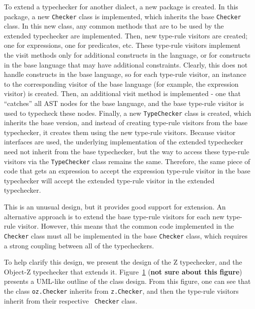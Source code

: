 \documentclass{llncs}
\begin{document}
To extend a typechecker for another dialect, a new package is created.
In this package, a new {\tt Checker} class is implemented, which
inherits the base {\tt Checker} class. In this new class, any common
methods that are to be used by the extended typechecker are
implemented. Then, new type-rule visitors are created; one for
expressions, one for predicates, etc.  These type-rule visitors
implement the visit methods only for additional constructs in the
language, or for constructs in the base language that may have
additional constraints. Clearly, this does not handle constructs in
the base language, so for each type-rule visitor, an instance to the
corresponding visitor of the base language (for example, the
expression visitor) is created. Then, an additional visit method is
implemented - one that ``catches'' all AST nodes for the base
language, and the base type-rule visitor is used to typecheck these
nodes. Finally, a new {\tt TypeChecker} class is created, which
inherits the base version, and instead of creating type-rule visitors
from the base typechecker, it creates them using the new type-rule
visitors. Because visitor interfaces are used, the underlying
implementation of the extended typechecker need not inherit from the
base typechecker, but the way to access these type-rule visitors via
the {\tt TypeChecker} class remains the same. Therefore, the same
piece of code that gets an expression to accept the expression
type-rule visitor in the base typechecker will accept the extended
type-rule visitor in the extended typechecker.

This is an unusual design, but it provides good support for
extension. An alternative approach is to extend the base type-rule
visitors for each new type-rule visitor. However, this means that the
common code implemented in the {\tt Checker} class must all be
implemented in the base {\tt Checker} class, which requires a strong
coupling between all of the typecheckers.

To help clarify this design, we present the design of the Z
typechecker, and the Object-Z typechecker that extends
it. Figure~\ref{tc-design} ({\bf not sure about this figure}) presents
a UML-like outline of the class design. From this figure, one can see
that the class {\tt oz.Checker} inherits from {\tt z.Checker}, and
then the type-rule visitors inherit from their respective {\tt
Checker} class.

\def\epsfsize#1#2{0.70#1}
\begin{figure}[t]
\begin{center}
\label{tc-design}
\end{center}
\end{figure}
\def\epsfsize#1#2{\epsfxsize}
\end{document}
